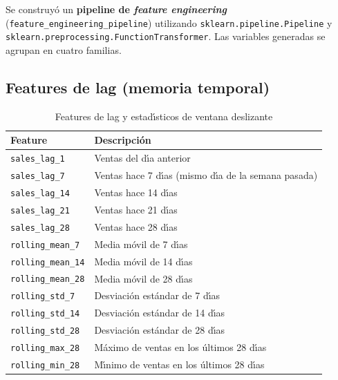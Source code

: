\documentclass[12pt, a4paper, oneside]{report}
\newcommand{\code}[1]{\texttt{\small\color{codeblue}#1}}
\begin{document}
Se construy\'o un \textbf{pipeline de \textit{feature engineering}} (\code{feature\_engineering\_pipeline}) utilizando \code{sklearn.pipeline.Pipeline} y \code{sklearn.preprocessing.FunctionTransformer}. Las variables generadas se agrupan en cuatro familias.

\subsection{Features de lag (memoria temporal)}

\begin{table}[H]
  \centering
  \caption{Features de lag y estad\'{\i}sticos de ventana deslizante}
  \label{tab:lag_features}
  \begin{tabularx}{\textwidth}{L{3.8cm} X}
    \toprule
    {\color{white}\textbf{Feature}} & {\color{white}\textbf{Descripci\'on}} \\
    \midrule
       \code{sales\_lag\_1}           & Ventas del d\'{\i}a anterior \\
      \code{sales\_lag\_7}           & Ventas hace 7 d\'{\i}as (mismo d\'{\i}a de la semana pasada) \\
       \code{sales\_lag\_14}          & Ventas hace 14 d\'{\i}as \\
      \code{sales\_lag\_21}          & Ventas hace 21 d\'{\i}as \\
       \code{sales\_lag\_28}          & Ventas hace 28 d\'{\i}as \\
      \code{rolling\_mean\_7}        & Media m\'ovil de 7 d\'{\i}as \\
       \code{rolling\_mean\_14}       & Media m\'ovil de 14 d\'{\i}as \\
      \code{rolling\_mean\_28}       & Media m\'ovil de 28 d\'{\i}as \\
       \code{rolling\_std\_7}         & Desviaci\'on est\'andar de 7 d\'{\i}as \\
      \code{rolling\_std\_14}        & Desviaci\'on est\'andar de 14 d\'{\i}as \\
       \code{rolling\_std\_28}        & Desviaci\'on est\'andar de 28 d\'{\i}as \\
      \code{rolling\_max\_28}        & M\'aximo de ventas en los \'ultimos 28 d\'{\i}as \\
       \code{rolling\_min\_28}        & M\'{\i}nimo de ventas en los \'ultimos 28 d\'{\i}as \\
    \bottomrule
  \end{tabularx}
\end{table}
\end{document}
